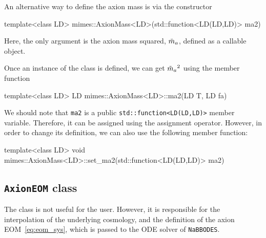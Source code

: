 \documentclass[11pt,a4paper]{article}
\begin{document}
An alternative way to define the axion mass is via the constructor
%
\begin{cpp}
	template<class LD>
	mimes::AxionMass<LD>(std::function<LD(LD,LD)> ma2)
\end{cpp}
%
Here, the only argument is the axion mass squared, $\tilde m_{a}{}$, defined as a callable object.


Once an instance of the class is defined, we can get $\tilde m_{a}{}^2$ using the member function
%
\begin{cpp}
	template<class LD>	LD mimes::AxionMass<LD>::ma2(LD T, LD fa)
\end{cpp}
%
We should note that {\tt ma2} is a public {\tt std::function<LD(LD,LD)>} member variable. Therefore, it can be assigned using the assignment operator. However,  in order to change its definition, we can also use the following member function:
%
\begin{cpp}
	template<class LD> void mimes::AxionMass<LD>::set_ma2(std::function<LD(LD,LD)> ma2)
\end{cpp}


\subsection{{\tt AxionEOM} class}
%
The  class is not useful for the user. However, it is responsible for the interpolation of the underlying cosmology, and the definition of the axion EOM~\ref{eq:eom_sys}, which is passed to the ODE solver of {\tt NaBBODES}. 
\end{document}
